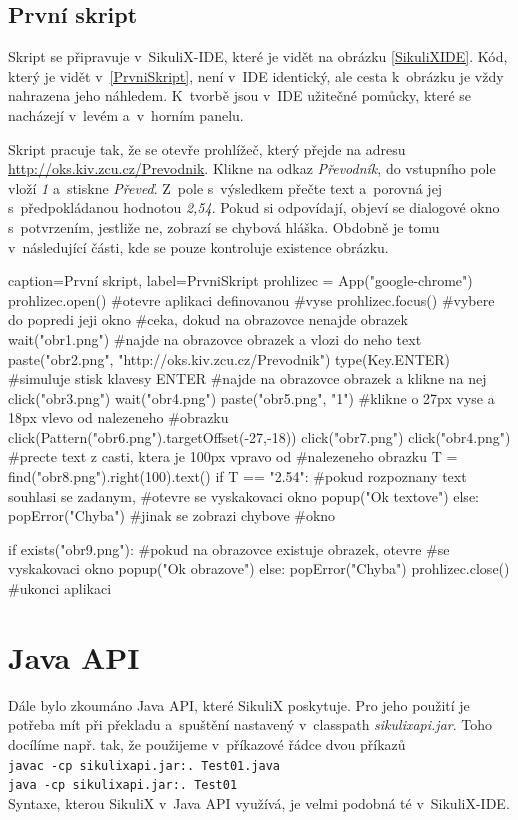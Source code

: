 		\subsection{První skript}
		Skript se připravuje v~SikuliX-IDE, které je vidět na obrázku \ref{SikuliXIDE}. Kód, který je vidět v~\ref{PrvniSkript}, není v~IDE identický, ale cesta k~obrázku je vždy nahrazena jeho náhledem. K~tvorbě jsou v~IDE užitečné pomůcky, které se nacházejí v~levém a~v~horním panelu.
		
		Skript pracuje tak, že se otevře prohlížeč, který přejde na adresu \url{http://oks.kiv.zcu.cz/Prevodnik}. Klikne na odkaz \emph{Převodník}, do vstupního pole vloží \emph{1} a~stiskne \emph{Převeď}. Z~pole s~výsledkem přečte text a~porovná jej s~předpokládanou hodnotou \emph{2,54}. Pokud si odpovídají, objeví se dialogové okno s~potvrzením, jestliže ne, zobrazí se chybová hláška. Obdobně je tomu v~následující části, kde se pouze kontroluje existence obrázku.
		
			\begin{lstpython}{caption={První skript}, label={PrvniSkript}}
prohlizec = App("google-chrome")
prohlizec.open()	#otevre aplikaci definovanou
				#vyse
prohlizec.focus()	#vybere do popredi jeji okno
#ceka, dokud na obrazovce nenajde obrazek
wait("obr1.png")
#najde na obrazovce obrazek a vlozi do neho text
paste("obr2.png", "http://oks.kiv.zcu.cz/Prevodnik")
type(Key.ENTER)	#simuluje stisk klavesy ENTER
#najde na obrazovce obrazek a klikne na nej
click("obr3.png")
wait("obr4.png")
paste("obr5.png", "1")
#klikne o 27px vyse a 18px vlevo od nalezeneho
#obrazku
click(Pattern("obr6.png").targetOffset(-27,-18))
click("obr7.png")
click("obr4.png")
#precte text z casti, ktera je 100px vpravo od
#nalezeneho obrazku
T = find("obr8.png").right(100).text()
if T == "2.54":
	#pokud rozpoznany text souhlasi se zadanym,
	#otevre se vyskakovaci okno
    popup("Ok textove")
else:
    popError("Chyba")    #jinak se zobrazi chybove
    			 #okno

if exists("obr9.png"):
	#pokud na obrazovce existuje obrazek, otevre
	#se vyskakovaci okno
    popup("Ok obrazove")
else:
    popError("Chyba")
prohlizec.close()    #ukonci aplikaci
		\end{lstpython}
		
	\section{Java API}
	Dále bylo zkoumáno Java API, které SikuliX poskytuje. Pro jeho použití je potřeba mít při překladu a~spuštění nastavený v~classpath \emph{sikulixapi.jar}. Toho docílíme např. tak, že použijeme v~příkazové řádce dvou příkazů\\\texttt{javac -cp sikulixapi.jar:. Test01.java}\\\texttt{java -cp sikulixapi.jar:. Test01}\\ Syntaxe, kterou SikuliX v~Java API využívá, je velmi podobná té v~SikuliX-IDE.
	
